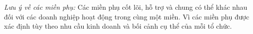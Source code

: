 \emph{Lưu ý về các miền phụ:} Các miền phụ cốt lõi, hỗ trợ và chung có thể khác nhau đối với các doanh nghiệp hoạt động trong cùng một miền. Vì các miền phụ được xác định tùy theo nhu cầu kinh doanh và bối cảnh cụ thể của mỗi tổ chức.